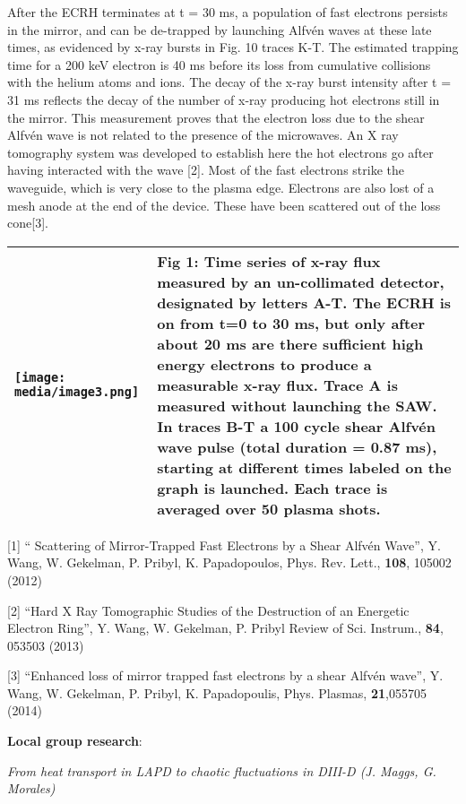 \documentclass[11pt]{article}
\begin{document}
\begin{description}
After the ECRH terminates at t = 30 ms, a population of fast electrons
persists in the mirror, and can be de-trapped by launching Alfvén waves
at these late times, as evidenced by x-ray bursts in Fig. 10 traces K-T.
The estimated trapping time for a 200 keV electron is 40 ms before its
loss from cumulative collisions with the helium atoms and ions. The
decay of the x-ray burst intensity after t = 31 ms reflects the decay of
the number of x-ray producing hot electrons still in the mirror. This
measurement proves that the electron loss due to the shear Alfvén wave
is not related to the presence of the microwaves. An X ray tomography
system was developed to establish here the hot electrons go after having
interacted with the wave {[}2{]}. Most of the fast electrons strike the
waveguide, which is very close to the plasma edge. Electrons are also
lost of a mesh anode at the end of the device. These have been scattered
out of the loss cone{[}3{]}.

\begin{longtable}[c]{@{}ll@{}}
\toprule
\texttt{[image: media/image3.png]} & Fig 1: Time series of x-ray flux
measured by an un-collimated detector, designated by letters A-T. The
ECRH is on from t=0 to 30 ms, but only after about 20 ms are there
sufficient high energy electrons to produce a measurable x-ray flux.
Trace A is measured without launching the SAW. In traces B-T a 100 cycle
shear Alfvén wave pulse (total duration = 0.87 ms), starting at
different times labeled on the graph is launched. Each trace is averaged
over 50 plasma shots.\tabularnewline
\midrule
\endhead
\bottomrule
\end{longtable}

{[}1{]} `` Scattering of Mirror-Trapped Fast Electrons by a Shear Alfvén
Wave'', Y. Wang, W. Gekelman, P. Pribyl, K. Papadopoulos, Phys. Rev.
Lett., \textbf{108}, 105002 (2012)

{[}2{]} ``Hard X Ray Tomographic Studies of the Destruction of an
Energetic Electron Ring'', Y. Wang, W. Gekelman, P. Pribyl Review of
Sci. Instrum., \textbf{84}, 053503 (2013)

{[}3{]} ``Enhanced loss of mirror trapped fast electrons by a shear
Alfvén wave'', Y. Wang, W. Gekelman, P. Pribyl, K. Papadopoulis, Phys.
Plasmas, \textbf{21},055705 (2014)


\textbf{Local group research}:

\emph{From heat transport in LAPD to chaotic fluctuations in DIII-D (J.
Maggs, G. Morales)}


\end{description}
\end{document}
